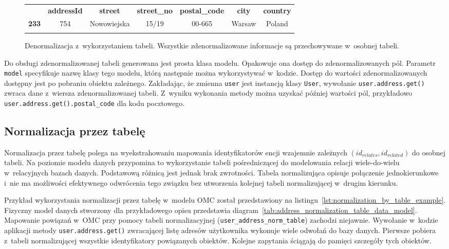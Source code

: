 \begin{figure}[ht!]
	\centering

	\begin{tabular}{|l||c|c|c|c|c|c|}
		\hhline{|-||------|}
		 & \textbf{addressId} & \textbf{street} & \textbf{street\_no} & \textbf{postal\_code} & \textbf{city} & \textbf{country} \\
		\hhline{|~||======|}
		\textbf{233} & 754 & Nowowiejska & 15/19 & 00-665 & Warsaw & Poland \\
		\hhline{|-||------|}
	\end{tabular} 

	\caption{Denormalizacja z~wykorzystaniem tabeli. Wszystkie zdenormalizowane informacje są przechowywane w~osobnej tabeli.}
	\label{tab:address_denormalization_by_table_example}
\end{figure}

Do obsługi zdenormalizowanej tabeli generowana jest prosta klasa modelu. Opakowuje ona dostęp do zdenormalizowanych pól. Parametr \verb+model+ specyfikuje nazwę klasy tego modelu, którą następnie można wykorzystywać w~kodzie. Dostęp do wartości zdenormalizowanych dostępny jest po pobraniu obiektu zależnego. Zakładając, że zmienna \verb+user+ jest instancją klasy \verb+User+, wywołanie \verb+user.address.get()+ zwraca dane z~wiersza zdenormalizowanej tabeli. Z~wyniku wykonania metody można uzyskać później wartości pól, przykładowo \verb+user.address.get().postal_code+ dla kodu pocztowego. 

\subsection{Normalizacja przez tabelę}
\label{sec:normalization_by_table}

Normalizacja przez tabelę polega na wyekstrahowaniu mapowania identyfikatorów encji wzajemnie zależnych $(id_{relates}, id_{related})$ do osobnej tabeli. Na poziomie modelu danych przypomina to wykorzystanie tabeli pośredniczącej do modelowania relacji wiele-do-wielu w~relacyjnych bazach danych. Podstawową różnicą jest jednak brak zwrotności. Tabela normalizująca opisuje połączenie jednokierunkowe i~nie ma możliwości efektywnego odwrócenia tego związku bez utworzenia kolejnej tabeli normalizującej w~drugim kierunku.

Przykład wykorzystania normalizacji przez tabelę w~modelu OMC został przedstawiony na listingu~\ref{lst:normalization_by_table_example}. Fizyczny model danych stworzony dla przykładowego opisu przedstawia diagram~\ref{tab:address_normalization_table_data_model}. Mapowanie powiązań w~OMC przy pomocy tabeli normalizacyjnej (\verb+user_address_norm_table+) zachodzi niejawnie. Wywołanie w~kodzie aplikacji metody \verb+user.address.get()+ zwracającej listę adresów użytkownika wykonuje wiele odwołań do bazy danych. Pierwsze pobiera z~tabeli normalizującej wszystkie identyfikatory powiązanych obiektów. Kolejne zapytania ściągają do pamięci szczegóły tych obiektów.

